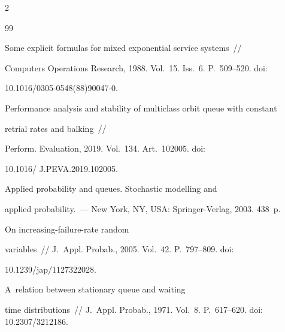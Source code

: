 \begin{multicols}{2}
{{\begin{thebibliography}{99}


Some explicit formulas for mixed exponential service systems~//


Computers Operations Research, 1988. Vol.~15. Iss.~6. P.~509--520. doi: 


{10.1016/0305-0548(88)90047-0}.









Performance analysis and stability of multiclass orbit queue with constant 


retrial rates and balking~//


 Perform. Evaluation, 2019.  Vol.~134. Art.~102005. doi: 


10.1016/ J.PEVA.2019.102005.







 Applied probability and queues. Stochastic modelling and 


applied probability.~--- New York, NY, USA: Springer-Verlag, 2003. 438~p.







  On increasing-failure-rate random 


variables~// J.~Appl. Probab., 2005. Vol.~42. P.~797--809. doi: 


10.1239/jap/1127322028.







  A~relation between stationary queue and waiting 


time distributions~// J.~Appl. Probab., 1971. Vol.~8. P.~617--620. doi: 10.2307/3212186.














\end{thebibliography}





 }


 }





\end{multicols}





